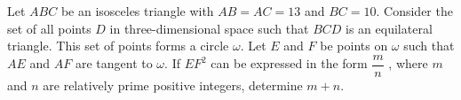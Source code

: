 Let $ABC$ be an isosceles triangle with $AB = AC = 13$ and $BC = 10$. Consider the set of all points $D$ in three-dimensional space such that $BCD$ is an equilateral triangle. This set of points forms a circle $\omega$. Let $E$ and $F$ be points on $\omega$ such that $AE$ and $AF$ are tangent to $\omega$. If $EF^2$ can be expressed in the form $\dfrac{m}{n}$ , where $m$ and $n$ are relatively prime positive integers, determine $m + n$.
